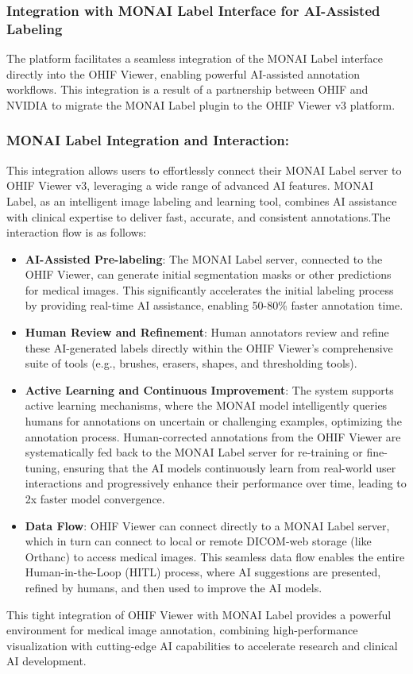 \subsubsection*{Integration with MONAI Label Interface for AI-Assisted Labeling}
The platform facilitates a seamless integration of the MONAI Label interface directly into the OHIF Viewer, enabling powerful AI-assisted annotation workflows. This integration is a result of a partnership between OHIF and NVIDIA to migrate the MONAI Label plugin to the OHIF Viewer v3 platform.
\subsubsection*{MONAI Label Integration and Interaction:}
This integration allows users to effortlessly connect their MONAI Label server to OHIF Viewer v3, leveraging a wide range of advanced AI features. MONAI Label, as an intelligent image labeling and learning tool, combines AI assistance with clinical expertise to deliver fast, accurate, and consistent annotations.The interaction flow is as follows:
\begin{itemize}
    \item \textbf{AI-Assisted Pre-labeling}: The MONAI Label server, connected to the OHIF Viewer, can generate initial segmentation masks or other predictions for medical images. This significantly accelerates the initial labeling process by providing real-time AI assistance, enabling 50-80\% faster annotation time.
    \item \textbf{Human Review and Refinement}: Human annotators review and refine these AI-generated labels directly within the OHIF Viewer's comprehensive suite of tools (e.g., brushes, erasers, shapes, and thresholding tools).
    \item \textbf{Active Learning and Continuous Improvement}: The system supports active learning mechanisms, where the MONAI model intelligently queries humans for annotations on uncertain or challenging examples, optimizing the annotation process. Human-corrected annotations from the OHIF Viewer are systematically fed back to the MONAI Label server for re-training or fine-tuning, ensuring that the AI models continuously learn from real-world user interactions and progressively enhance their performance over time, leading to 2x faster model convergence.
    \item \textbf{Data Flow}: OHIF Viewer can connect directly to a MONAI Label server, which in turn can connect to local or remote DICOM-web storage (like Orthanc) to access medical images. This seamless data flow enables the entire Human-in-the-Loop (HITL) process, where AI suggestions are presented, refined by humans, and then used to improve the AI models.
\end{itemize}

This tight integration of OHIF Viewer with MONAI Label provides a powerful environment for medical image annotation, combining high-performance visualization with cutting-edge AI capabilities to accelerate research and clinical AI development.
